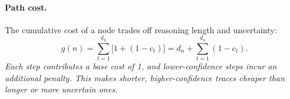 \documentclass[11pt]{article}
\begin{document}
\paragraph{Path cost.}
The cumulative cost of a node trades off reasoning length and uncertainty:
\begin{equation}
g(n) = \sum_{t=1}^{d_n} \big[1 + (1-c_t)\big]
    = d_n + \sum_{t=1}^{d_n}(1-c_t).
\label{eq:gcost}
\end{equation}
\textit{Each step contributes a base cost of 1, and lower-confidence steps incur an additional penalty. This makes shorter, higher-confidence traces cheaper than longer or more uncertain ones.}



\end{document}
